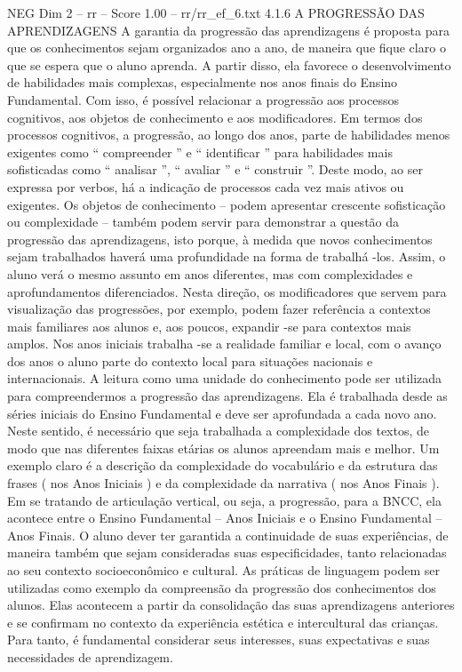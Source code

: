 \begin{textsample}{NEG Dim 2 – rr – Score 1.00 – rr/rr\_ef\_6.txt}  \label{ex:f2_neg_188}
4.1.6 A PROGRESSÃO DAS APRENDIZAGENS A garantia da progressão das aprendizagens é proposta para que os conhecimentos sejam organizados ano a ano, de maneira que fique claro o que se espera que o aluno aprenda.
A partir disso, ela favorece o desenvolvimento de habilidades mais complexas, especialmente nos anos finais do Ensino Fundamental.
Com isso, é possível relacionar a progressão aos processos cognitivos, aos objetos de conhecimento e aos modificadores.
Em termos dos processos cognitivos, a progressão, ao longo dos anos, parte de habilidades menos exigentes como “ compreender ” e “ identificar ” para habilidades mais sofisticadas como “ analisar ”, “ avaliar ” e “ construir ”.
Deste modo, ao ser expressa por verbos, há a indicação de processos cada vez mais ativos ou exigentes.
Os objetos de conhecimento – podem apresentar crescente sofisticação ou complexidade – também podem servir para demonstrar a questão da progressão das aprendizagens, isto porque, à medida que novos conhecimentos sejam trabalhados haverá uma profundidade na forma de trabalhá -los.
Assim, o aluno verá o mesmo assunto em anos diferentes, mas com complexidades e aprofundamentos diferenciados.
Nesta direção, os modificadores que servem para visualização das progressões, por exemplo, podem fazer referência a contextos mais familiares aos alunos e, aos poucos, expandir -se para contextos mais amplos.
Nos anos iniciais trabalha -se a realidade familiar e local, com o avanço dos anos o aluno parte do contexto local para situações nacionais e internacionais.
A leitura como uma unidade do conhecimento pode ser utilizada para compreendermos a progressão das aprendizagens.
Ela é trabalhada desde as séries iniciais do Ensino Fundamental e deve ser aprofundada a cada novo ano.
Neste sentido, é necessário que seja trabalhada a complexidade dos textos, de modo que nas diferentes faixas etárias os alunos apreendam mais e melhor.
Um exemplo claro é a descrição da complexidade do vocabulário e da estrutura das frases ( nos Anos Iniciais ) e da complexidade da narrativa ( nos Anos Finais ).
Em se tratando de articulação vertical, ou seja, a progressão, para a BNCC, ela acontece entre o Ensino Fundamental – Anos Iniciais e o Ensino Fundamental – Anos Finais.
O aluno dever ter garantida a continuidade de suas experiências, de maneira também que sejam consideradas suas especificidades, tanto relacionadas ao seu contexto socioeconômico e cultural.
As práticas de linguagem podem ser utilizadas como exemplo da compreensão da progressão dos conhecimentos dos alunos.
Elas acontecem a partir da consolidação das suas aprendizagens anteriores e se confirmam no contexto da experiência estética e intercultural das crianças.
Para tanto, é fundamental considerar seus interesses, suas expectativas e suas necessidades de aprendizagem.

\end{textsample}
